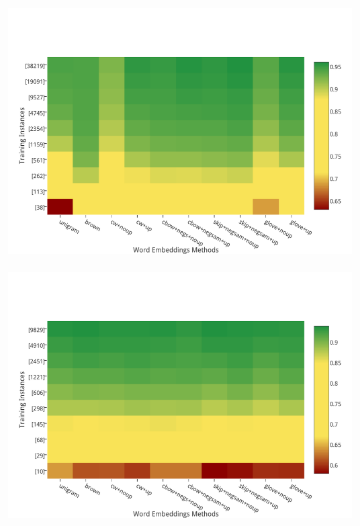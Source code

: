 \begin{figure}
\caption{Best results for each method for POS-Tagging, Chunking, NER and MWE identification. The x-axis correspond to the different word embeddings methods and the y-axis to the 10 training partitions at log scale. Green color stand for high performance, while red color stands for low performance. The methods are in chronological order; wherein the suffix \textit{up} stands for \textit{updated or fine-tuned features}, and \textit{noup} stands for \textit{no-updated} features.}
\centering
\begin{subfigure}{7cm}
	\centering
    \includegraphics[scale=0.4]{plots/map-pos-color-invert}    	
	\label{pos}
\end{subfigure}
\begin{subfigure}{7cm}
	\centering
    \includegraphics[scale=0.4]{plots/map-chunk-color-invert}

\end{subfigure}
\end{figure}
